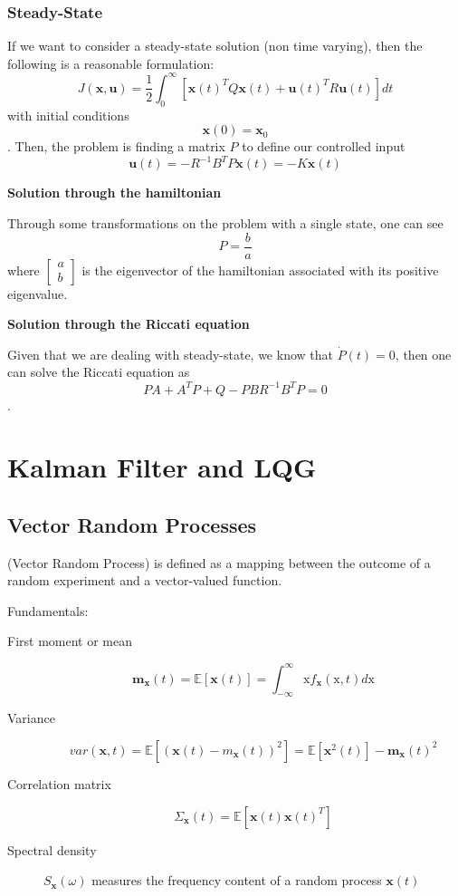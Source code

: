 \documentclass[a4paper]{report}
\begin{document}
\subsubsection*{Steady-State}

If we want to consider a steady-state solution (non time varying), then the following is a reasonable formulation: \[
J\left( \bm{x}, \bm{u} \right) = \frac{1}{2}\int_0^{\infty}\left[ \bm{x}(t)^{T}Q\bm{x}(t) + \bm{u}(t)^{T}R\bm{u}(t) \right] dt
\] with initial conditions \[
\bm{x}(0) = \bm{x}_0
\]. Then, the problem is finding a matrix $P$ to define our controlled input \[
\bm{u}(t) = -R^{-1}B^{T}P\bm{x}(t) = -K\bm{x}(t)
\] 

\textbf{Solution through the hamiltonian}

Through some transformations on the problem with a single state, one can see \[
P = \frac{b}{a}
\] where $\begin{bmatrix} a \\ b \end{bmatrix} $ is the eigenvector of the hamiltonian associated with its positive eigenvalue.

\textbf{Solution through the Riccati equation}

Given that we are dealing with steady-state, we know that $\dot{P}(t) = 0$, then one can solve the Riccati equation as \[
PA + A^{T}P + Q - PBR^{-1}B^{T}P = 0
\].

\section*{Kalman Filter and LQG}

\subsection*{Vector Random Processes}

\begin{definition}
    (Vector Random Process) is defined as a mapping between the outcome of a random experiment and a vector-valued function.
\end{definition}

Fundamentals:
\begin{description}
    \item[First moment or mean] \[
	    \bm{m}_{\bm{x}}(t) = \mathbb{E}[\bm{x}(t)] = \int_{-\infty}^{\infty}\text{x}f_{\bm{x}}(\text{x}, t)d\text{x}
    \] 
    \item[Variance] \[
	    var(\bm{x},t) = \mathbb{E}[(\bm{x}(t) - m_{\bm{x}}(t))^{2}] = \mathbb{E}[\bm{x}^{2}(t)] - \bm{m}_{\bm{x}}(t)^{2}
\] 
\item[Correlation matrix] \[
	\Sigma_{\bm{x}}(t) = \mathbb{E}[\bm{x}(t)\bm{x}(t)^{T}]
\] 
\item[Spectral density] $S_{\bm{x}}(\omega)$ measures the frequency content of a random process $\bm{x}(t)$
\end{description}
\end{document}
